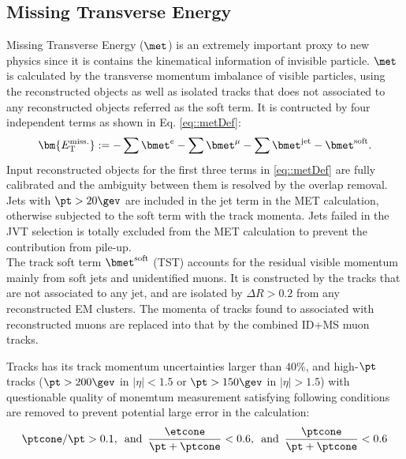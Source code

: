 \subsection{Missing Transverse Energy} \label{sec::objDef::met}
Missing Transverse Energy ($\met$) is an extremely important proxy to new physics since it is contains the kinematical information of invisible particle. $\met$ is calculated by the transverse momentum imbalance of visible particles, using the reconstructed objects as well as isolated tracks that does not associated to any reconstructed objects referred as the soft term.
It is contructed by four independent terms as shown in Eq. \ref{eq::metDef}:
\begin{align}
\bm{E_\mathrm{T}^{\mathrm{miss.}}} :=  - \sum \bmet^{e} - \sum \bmet^{\mu} - \sum \bmet^{\mathrm{jet}} - \bmet^{\mathrm{soft}}.
\label{eq::metDef}
\end{align}
Input reconstructed objects for the first three terms in \ref{eq::metDef} are fully calibrated and the ambiguity between them is resolved by the overlap removal. 
Jets with $\pt>20\gev$ are included in the jet term in the MET calculation, otherwise subjected to the soft term with the track momenta.
Jets failed in the JVT selection is totally excluded from the MET calculation to prevent the contribution from pile-up. \\

The track soft term $\bmet^{\mathrm{soft}}$ (TST) \cite{175_MET_Run2_exp} accounts for the residual visible momentum mainly from soft jets and unidentified muons.
It is constructed by the tracks that are not associated to any jet, and are isolated by $\Delta R>0.2$ from any reconstructed EM clusters. The momenta of tracks found to associated with reconstructed muons are replaced into that by the combined ID+MS muon tracks. 

Tracks has its track momentum uncertainties larger than $40\%$, and high-$\pt$ tracks ($\pt>200 \gev$ in $|\eta|<1.5$ or $\pt>150 \gev$ in $|\eta|>1.5$) with questionable quality of monemtum measurement satisfying following conditions are removed to prevent potential large error in the calculation:
\begin{align}
\ptcone/\pt>0.1, \,\,\, \mathrm{and} \,\,\, \frac{\etcone}{\pt+\ptcone}<0.6, \,\,\,  \mathrm{and} \,\,\, \frac{\ptcone}{\pt+\ptcone}<0.6
\end{align}



